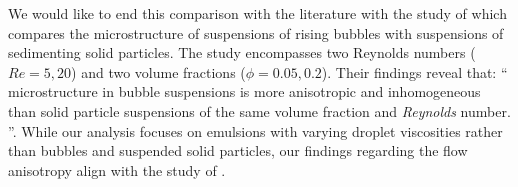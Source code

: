 We would like to end this comparison with the literature with the study of \citet{yin2008lattice} which compares the microstructure of suspensions of rising bubbles with suspensions of sedimenting solid particles.
The study encompasses two Reynolds numbers ($Re = 5, 20$) and two volume fractions ($\phi = 0.05, 0.2$). Their findings reveal that: 
\enquote{    
     microstructure in bubble
    suspensions is more anisotropic and inhomogeneous than
    solid particle suspensions of the same volume fraction and
    \textit{Reynolds} number.    
}. 
While our analysis focuses on emulsions with varying droplet viscosities rather than bubbles and suspended solid particles, our findings regarding the flow anisotropy align with the study of \citet{yin2008lattice}. 



